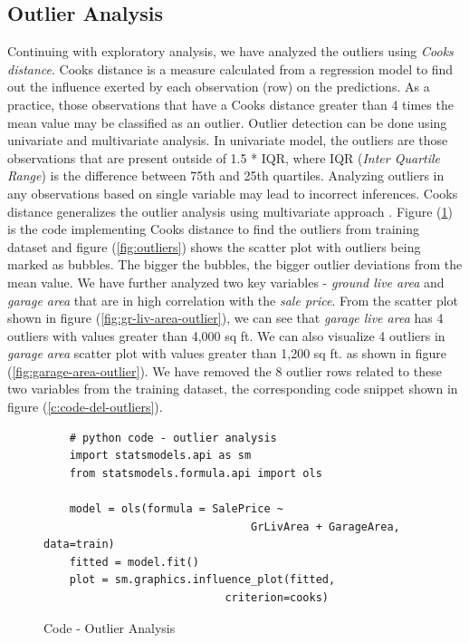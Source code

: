 \documentclass[sigconf]{acmart}
\begin{document}
	\subsection{Outlier Analysis}
	
	Continuing with exploratory analysis, we have analyzed the outliers using {\em Cooks distance}. Cooks distance is a measure calculated from a regression model to find out the influence exerted by each observation (row) on the predictions. As a practice,  those observations that have a Cooks distance greater than 4 times the mean value may be classified as an outlier. Outlier detection can be done using univariate and multivariate analysis. In univariate model, the outliers are those observations that are present outside of 1.5 * IQR, where IQR ({\em Inter Quartile Range}) is the difference between 75th and 25th quartiles. Analyzing outliers in any observations based on single variable may lead to incorrect inferences. Cooks distance generalizes the outlier analysis using multivariate approach \cite{1}. Figure (\ref{c:code-outliers}) is the code implementing Cooks distance to find the outliers from training dataset and figure (\ref{fig:outliers}) shows the scatter plot with outliers being marked as bubbles. The bigger the bubbles, the bigger outlier deviations from the mean value. We have further analyzed two key variables - {\em ground live area} and {\em garage area} that are in high correlation with the {\em sale price}. From the scatter plot shown in figure (\ref{fig:gr-liv-area-outlier}), we can see that {\em garage live area} has 4 outliers with values greater than 4,000 sq ft. We can also visualize 4 outliers in {\em garage area} scatter plot with values greater than 1,200 sq ft. as shown in figure (\ref{fig:garage-area-outlier}).  We have removed the 8 outlier rows related to these two variables from the training dataset, the corresponding code snippet shown in figure (\ref{c:code-del-outliers}).
	
	\begin{figure}[htb]		
	\begin{verbatim}	
	# python code - outlier analysis
	import statsmodels.api as sm
	from statsmodels.formula.api import ols
	
	model = ols(formula = SalePrice ~ 
								GrLivArea + GarageArea, data=train)
	fitted = model.fit()    	
	plot = sm.graphics.influence_plot(fitted, 
							criterion=cooks)		
	\end{verbatim}
	\caption{Code - Outlier Analysis} \label{c:code-outliers} 
	\end{figure}
\end{document}
